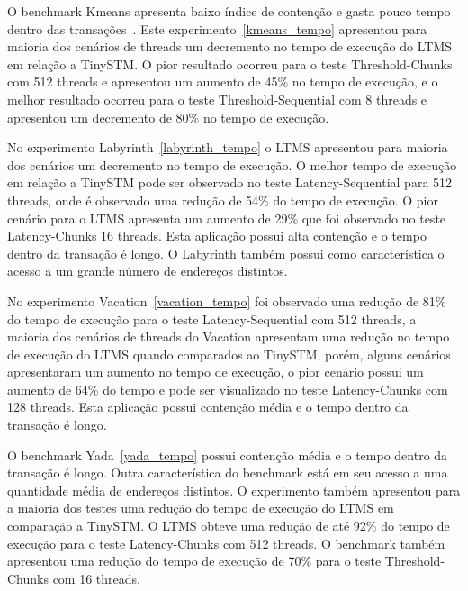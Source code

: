 \documentclass[diss,capa]{texufpel}
\begin{document}


O benchmark Kmeans apresenta baixo índice de contenção e gasta pouco tempo dentro das transações~\cite{STAMP}. Este experimento~\ref{kmeans_tempo} apresentou para maioria dos cenários de threads um decremento no tempo de execução do LTMS em relação a TinySTM. O pior resultado ocorreu para o teste Threshold-Chunks com 512 threads e apresentou um aumento de 45\% no tempo de execução, e o melhor resultado ocorreu para o teste Threshold-Sequential com 8 threads e apresentou um decremento de 80\% no tempo de execução.



No experimento Labyrinth~\ref{labyrinth_tempo} o LTMS apresentou para maioria dos cenários um decremento no tempo de execução. O melhor tempo de execução em relação a TinySTM pode ser observado no teste Latency-Sequential para 512 threads, onde é observado uma redução de 54\% do tempo de execução. O pior cenário para o LTMS apresenta um aumento de 29\% que foi observado no teste Latency-Chunks 16 threads. Esta aplicação possui alta contenção e o tempo dentro da transação é longo. O Labyrinth também possui como característica o acesso a um grande número de endereços distintos.



No experimento Vacation~\ref{vacation_tempo} foi observado uma redução de 81\% do tempo de execução para o teste Latency-Sequential com 512 threads, a maioria dos cenários de threads do Vacation apresentam uma redução no tempo de execução do LTMS quando comparados ao TinySTM, porém, alguns cenários apresentaram um aumento no tempo de execução, o pior cenário possui um aumento de 64\% do tempo e pode ser visualizado no teste Latency-Chunks com 128 threads. Esta aplicação possui contenção média e o tempo dentro da transação é longo.



O benchmark Yada~\ref{yada_tempo} possui contenção média e o tempo dentro da transação é longo. Outra característica do benchmark está em seu acesso a uma quantidade média de endereços distintos. O experimento também apresentou para a maioria dos testes uma redução do tempo de execução do LTMS em comparação a TinySTM. O LTMS obteve uma redução de até 92\% do tempo de execução para o teste Latency-Chunks com 512 threads. O benchmark também apresentou uma redução do tempo de execução de 70\% para o teste Threshold-Chunks com 16 threads.
\end{document}

